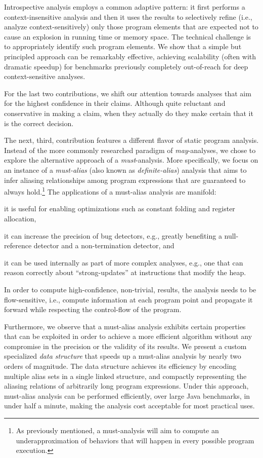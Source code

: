 Introspective analysis employs a common adaptive pattern: it first performs a context-insensitive analysis and then it uses the results to selectively refine (i.e., analyze context-sensitively) only those program elements that are expected not to cause an explosion in running time or memory space. The technical challenge is to appropriately identify such program elements. We show that a simple but principled approach can be remarkably effective, achieving scalability (often with dramatic speedup) for benchmarks previously completely out-of-reach for deep context-sensitive analyses.

For the last two contributions, we shift our attention towards analyses that aim for the highest confidence in their claims. Although quite reluctant and conservative in making a claim, when they actually do they make certain that it is the correct decision.

 The next, third, contribution features a different flavor of static program analysis. Instead of the more commonly researched paradigm of \emph{may}-analyses, we chose to explore the alternative approach of a \emph{must}-analysis. More specifically, we focus on an instance of a \emph{must-alias} (also known as \emph{definite-alias}) analysis that aims to infer aliasing relationships among program expressions that are guaranteed to always hold.\footnote{As previously mentioned, a must-analysis will aim to compute an underapproximation of behaviors that will happen in every possible program execution.} The applications of a must-alias analysis are manifold:
\begin{inparaenum}[(1)]
\item it is useful for enabling optimizations such as constant folding and register allocation,
\item it can increase the precision of bug detectors, e.g., greatly benefiting a null-reference detector and a non-termination detector, and
\item it can be used internally as part of more complex analyses, e.g., one that can reason correctly about ``strong-updates'' at instructions that modify the heap.
\end{inparaenum}
In order to compute high-confidence, non-trivial, results, the analysis needs to be flow-sensitive, i.e., compute information at each program point and propagate it forward while respecting the control-flow of the program.

Furthermore, we observe that a must-alias analysis exhibits certain properties that can be exploited in order to achieve a more efficient algorithm without any compromise in the precision or the validity of its results. We present a custom specialized \emph{data structure} that speeds up a must-alias analysis by nearly two orders of magnitude. The data structure achieves its efficiency by encoding multiple alias sets in a single linked structure, and compactly representing the aliasing relations of arbitrarily long program expressions. Under this approach, must-alias analysis can be performed efficiently, over large Java benchmarks, in under half a minute, making the analysis cost acceptable for most practical uses.

